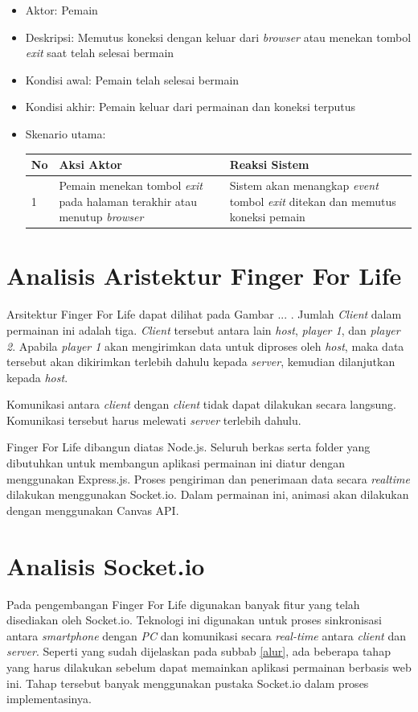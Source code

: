 \begin{enumerate}
\begin{itemize}
			\item Aktor: Pemain
			
			\item Deskripsi: Memutus koneksi dengan keluar dari \textit{browser} atau menekan tombol \textit{exit} saat telah selesai bermain
			
			\item Kondisi awal: Pemain telah selesai bermain
			
			\item Kondisi akhir: Pemain keluar dari permainan dan koneksi terputus
			
			\item Skenario utama:
			
			\begin{tabular}{ |p{1cm}|p{4cm}|p{4cm}|}
				\hline
				No & Aksi Aktor & Reaksi Sistem \\ \hline
				1 & Pemain menekan tombol \textit{exit} pada halaman terakhir atau menutup \textit{browser} & Sistem akan menangkap \textit{event} tombol \textit{exit} ditekan dan memutus koneksi pemain \\ \hline
			\end{tabular}
		\end{itemize}
\end{enumerate}


\section{Analisis Aristektur Finger For Life}
Arsitektur Finger For Life dapat dilihat pada Gambar ... . Jumlah \textit{Client} dalam permainan ini adalah tiga. \textit{Client} tersebut antara lain \textit{host}, \textit{player 1}, dan \textit{player 2}. Apabila \textit{player 1} akan mengirimkan data untuk diproses oleh \textit{host}, maka data tersebut akan dikirimkan terlebih dahulu kepada \textit{server}, kemudian dilanjutkan kepada \textit{host}.

Komunikasi antara \textit{client} dengan \textit{client} tidak dapat dilakukan secara langsung. Komunikasi tersebut harus melewati \textit{server} terlebih dahulu. 

Finger For Life dibangun diatas Node.js. Seluruh berkas serta folder yang dibutuhkan untuk membangun aplikasi permainan ini diatur dengan menggunakan Express.js. Proses pengiriman dan penerimaan data secara \textit{realtime} dilakukan menggunakan Socket.io. Dalam permainan ini, animasi akan dilakukan dengan menggunakan Canvas API.

\section{Analisis Socket.io}
Pada pengembangan Finger For Life digunakan banyak fitur yang telah disediakan oleh Socket.io. Teknologi ini digunakan untuk proses sinkronisasi antara \textit{smartphone} dengan \textit{PC} dan komunikasi secara \textit{real-time} antara \textit{client} dan \textit{server}. Seperti yang sudah dijelaskan pada subbab \ref{alur}, ada beberapa tahap yang harus dilakukan sebelum dapat memainkan aplikasi permainan berbasis web ini. Tahap tersebut banyak menggunakan pustaka Socket.io dalam proses implementasinya.

